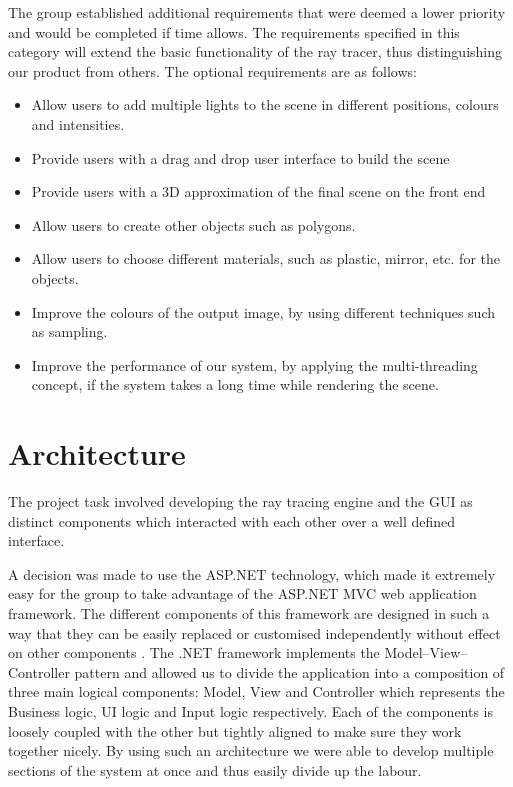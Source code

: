 \documentclass[a4paper]{report}
\begin{document}
	The group established additional requirements that were deemed a lower priority and would be completed if time allows.
	The requirements specified in this category will extend the basic functionality of the ray tracer, thus distinguishing our product from others. The optional requirements are as follows:
	\begin{itemize}
		\item Allow users to add multiple lights to the scene in different positions, colours and intensities.
		\item Provide users with a drag and drop user interface to build the scene
		\item Provide users with a 3D approximation of the final scene on the front end
		\item Allow users to create other objects such as polygons.
		\item Allow users to choose different materials, such as plastic, mirror, etc. for the objects.
		\item Improve the colours of the output image, by using different techniques such as sampling.
		\item Improve the performance of our system, by applying the multi-threading concept, if the system takes a long time while rendering the scene.
	\end{itemize}
	
	\section{Architecture}
	\label{sssec:arch}
	The project task involved developing the ray tracing engine and the GUI as distinct components which interacted with each other over a well defined interface.
	
	A decision was made to use the ASP.NET technology, which made it extremely easy for the group to take advantage of the ASP.NET MVC web application framework. The different components of this framework are designed in such a way that they can be easily replaced or customised independently without effect on other components \cite{microsoft_asp.net_2018}. The .NET framework implements the Model–View–Controller pattern and allowed us to divide the application into a composition of three main logical components: Model, View and Controller which represents the Business logic, UI logic and Input logic respectively. Each of the components is loosely coupled with the other but tightly aligned to make sure they work together nicely. By using such an architecture we were able to develop multiple sections of the system at once and thus easily divide up the labour. 
	
\end{document}
